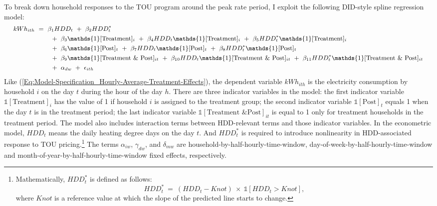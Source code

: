 To break down household responses to the TOU program around the peak rate period, I exploit the following DID-style spline regression model: %
\begin{equation}
\small
\begin{split}
    kWh_{ith} \ 
    & = \ \beta_{1} HDD_{t} \ + \ \beta_{2} HDD_{t}^{*} \\
    & \hspace{0.7cm} + \ \beta_{3} \mathds{1}[\text{Treatment}]_{i} \ + \ \beta_{4} HDD_{t} \mathds{1}[\text{Treatment}]_{i} \ + \ \beta_{5} HDD_{t}^{*} \mathds{1}[\text{Treatment}]_{i} \\
    & \hspace{0.7cm} + \ \beta_{6} \mathds{1}[\text{Post}]_{t} \ + \ \beta_{7} HDD_{t} \mathds{1}[\text{Post}]_{t} \ + \ \beta_{8} HDD_{t}^{*} \mathds{1}[\text{Post}]_{t} \\
    & \hspace{0.7cm} + \ \beta_{9} \mathds{1}[\text{Treatment \& Post}]_{it} \ + \ \beta_{10} HDD_{t} \mathds{1}[\text{Treatment \& Post}]_{it} \ + \ \beta_{11} HDD_{t}^{*} \mathds{1}[\text{Treatment \& Post}]_{it} \\
    & \hspace{0.7cm} + \ \alpha_{dw} \ + \ \epsilon_{ith}
\end{split}
\label{Eq:Model-Specification_Breakdown-of-Hourly-Average-Treatment-Effect}
\end{equation}
Like (\ref{Eq:Model-Specification_Hourly-Average-Treatment-Effects}), the dependent variable $kWh_{ith}$ is the electricity consumption by household $i$ on the day $t$ during the hour of the day $h$. There are three indicator variables in the model: the first indicator variable $\mathbb{1}[\text{Treatment}]_{i}$ has the value of 1 if household $i$ is assigned to the treatment group; the second indicator variable $\mathbb{1}[\text{Post}]_{t}$ equals 1 when the day $t$ is in the treatment period; the last indicator variable $\mathbb{1}[\text{Treatment \& Post}]_{it}$ is equal to 1 only for treatment households in the treatment period. The model also includes interaction terms between HDD-relevant terms and those indicator variables. In the econometric model, $HDD_{t}$ means the daily heating degree days on the day $t$. And $HDD_{t}^{*}$ is required to introduce nonlinearity in HDD-associated response to TOU pricing.\footnote{Mathematically, $HDD_{t}^{*}$ is defined as follows:
\begin{equation}
HDD_{t}^{*} \ = \ (HDD_{t} - Knot) \ \times \ \mathbb{1}[HDD_{t} > Knot],
\end{equation}
where $Knot$ is a reference value at which the slope of the predicted line starts to change.
} The terms $\alpha_{iw}$, $\gamma_{dw}$, and $\delta_{mw}$ are household-by-half-hourly-time-window, day-of-week-by-half-hourly-time-window and month-of-year-by-half-hourly-time-window fixed effects, respectively. 

